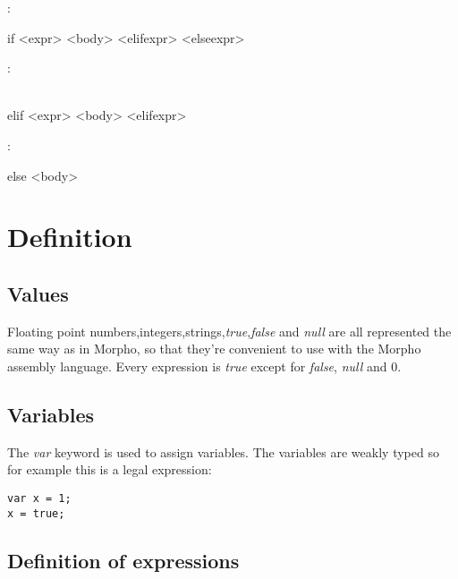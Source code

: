 \documentclass[12pt]{article}
\newcommand{\bs}[2]{%
\begin{minipage}{5in}%
\begin{syntdiag*}[\left{#1}\right{#2}][5in]%
}
\newcommand{\es}{\end{syntdiag*}\end{minipage}}
\begin{document}
\begin{framed}
:\\
\indent \bs {>>-} {-><} 
if <expr> <body> <elifexpr> <elseexpr>
\es
\end{framed}

\begin{framed}
:\\
\indent \bs {>>-} {-><} 
\begin{stack} 
	\\ 
	elif <expr> <body> <elifexpr>
\end{stack} 
\es
\end{framed}

\begin{framed}
:\\
\indent \bs {>>-} {-><} 
\begin{stack} 
	else <body>\\ 
	
\end{stack} 
\es
\end{framed}




\section{Definition}
\subsection{Values}
Floating point numbers,integers,strings,\emph{true},\emph{false} and \emph{null} are all represented the same way as in Morpho, so that they're convenient to use with the Morpho assembly language.
Every expression is \emph{true} except for \emph{false}, \emph{null} and 0.


\subsection{Variables}
The \emph{var} keyword is used to assign variables. The variables are weakly typed so for example this is a legal expression:
\begin{framed}
\begin{verbatim}
var x = 1;
x = true;
\end{verbatim}
\end{framed}


\subsection{Definition of expressions}
\end{document}
